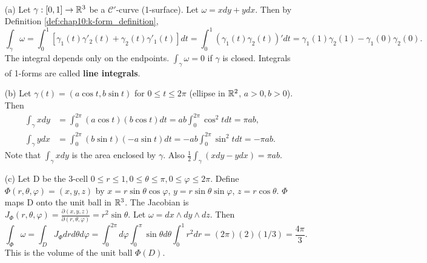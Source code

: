

\begin{example}
  \label{ex:chap10:form_integral_examples}
  ~ %
  \begin{itemize}
    \item[(a)] Let $\gamma: [0, 1] \to \mathbb{R}^3$ be a
      $\mathcal{C}'$-curve (1-surface). Let $\omega = x dy + y dx$.
      Then by Definition \ref{def:chap10:k-form_definition},
      \[
        \int_\gamma \omega = \int_0^1 [ \gamma_1(t) \gamma'_2(t) +
        \gamma_2(t) \gamma'_1(t) ] dt = \int_0^1 ( \gamma_1(t)
        \gamma_2(t) )' dt = \gamma_1(1)\gamma_2(1) - \gamma_1(0)\gamma_2(0).
      \]
      The integral depends only on the endpoints. $\int_\gamma \omega
      = 0$ if $\gamma$ is closed. Integrals of 1-forms are called
      \textbf{line integrals}.

    \item[(b)] Let $\gamma(t) = (a \cos t, b \sin t)$ for $0 \le t
      \le 2\pi$ (ellipse in $\mathbb{R}^2$, $a>0, b>0$). Then
      \begin{align*}
        \int_\gamma x dy &= \int_0^{2\pi} (a \cos t) (b \cos t) dt =
        ab \int_0^{2\pi} \cos^2 t dt = \pi ab, \\
        \int_\gamma y dx &= \int_0^{2\pi} (b \sin t) (-a \sin t) dt =
        -ab \int_0^{2\pi} \sin^2 t dt = -\pi ab.
      \end{align*}
      Note that $\int_\gamma x dy$ is the area enclosed by $\gamma$.
      Also $\frac{1}{2} \int_\gamma (x dy - y dx) = \pi ab$.

    \item[(c)] Let D be the 3-cell $0 \le r \le 1, 0 \le \theta \le
      \pi, 0 \le \varphi \le 2\pi$. Define $\Phi(r, \theta, \varphi)
      = (x, y, z)$ by $x = r \sin\theta \cos\varphi$, $y = r
      \sin\theta \sin\varphi$, $z = r \cos\theta$. $\Phi$ maps D onto
      the unit ball in $\mathbb{R}^3$. The Jacobian is $J_\Phi(r, \theta,
      \varphi) = \frac{\partial(x,y,z)}{\partial(r,\theta,\varphi)} =
      r^2 \sin\theta$. Let $\omega = dx \wedge dy \wedge dz$. Then
      \[
        \int_\Phi \omega = \int_D J_\Phi dr d\theta d\varphi =
        \int_0^{2\pi} d\varphi \int_0^\pi \sin\theta d\theta \int_0^1
        r^2 dr = (2\pi)(2)(1/3) = \frac{4\pi}{3}.
      \]
      This is the volume of the unit ball $\Phi(D)$.
  \end{itemize}
\end{example}

